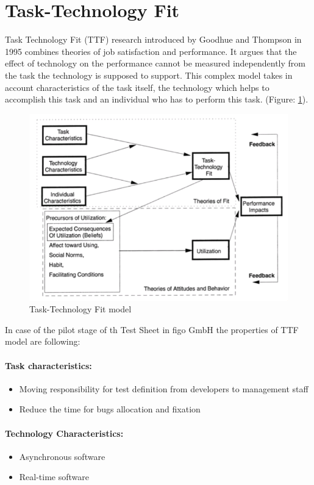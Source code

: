 \section{Task-Technology Fit}
Task Technology Fit (TTF) research introduced by Goodhue and Thompson in 1995 \cite{MES10} combines theories of job satisfaction and performance. It argues that the effect of technology on the performance cannot be measured independently from the task the technology is supposed to support. This complex model takes in account characteristics of the task itself, the technology which helps to accomplish this task and an individual who has to perform this task. (Figure: \ref{fig:ttf}).
\begin{figure}[ht]
	\label{fig:ttf}
	\centering
	\includegraphics[width=\textwidth]{grafiken/ttf.png}
	\caption{Task-Technology Fit model\cite{MES10}}
\end{figure}

In case of the pilot stage of th Test Sheet in figo GmbH the properties of TTF model are following:
\paragraph{Task characteristics:}
\begin{itemize}
	\item Moving responsibility for test definition from developers to management staff
	\item Reduce the time for bugs allocation and fixation
\end{itemize}


\paragraph{Technology Characteristics:}
\begin{itemize}
	\item Asynchronous software
	\item Real-time software
\end{itemize}

